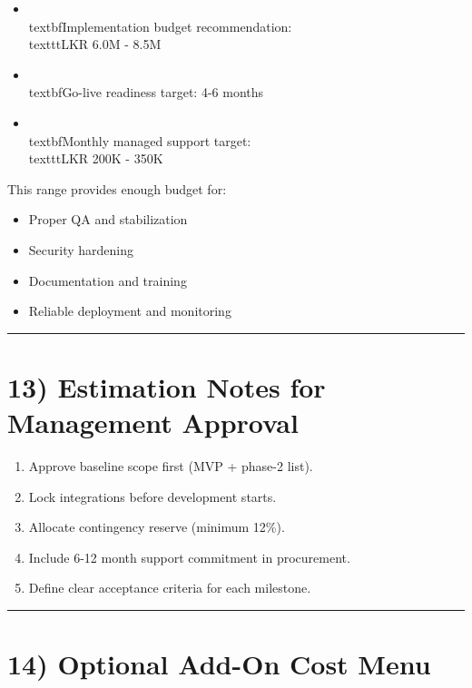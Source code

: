 \documentclass[11pt,a4paper]{article}
\begin{document}
\begin{itemize}
\item \\textbf{Implementation budget recommendation:} \\texttt{LKR 6.0M - 8.5M}
\item \\textbf{Go-live readiness target:} 4-6 months
\item \\textbf{Monthly managed support target:} \\texttt{LKR 200K - 350K}
\end{itemize}

This range provides enough budget for:\\

\begin{itemize}
\item Proper QA and stabilization
\item Security hardening
\item Documentation and training
\item Reliable deployment and monitoring
\end{itemize}

\bigskip\hrule\bigskip

\section{13) Estimation Notes for Management Approval}

\begin{enumerate}
\item Approve baseline scope first (MVP + phase-2 list).
\item Lock integrations before development starts.
\item Allocate contingency reserve (minimum 12\%).
\item Include 6-12 month support commitment in procurement.
\item Define clear acceptance criteria for each milestone.
\end{enumerate}

\bigskip\hrule\bigskip

\section{14) Optional Add-On Cost Menu}
\end{document}
